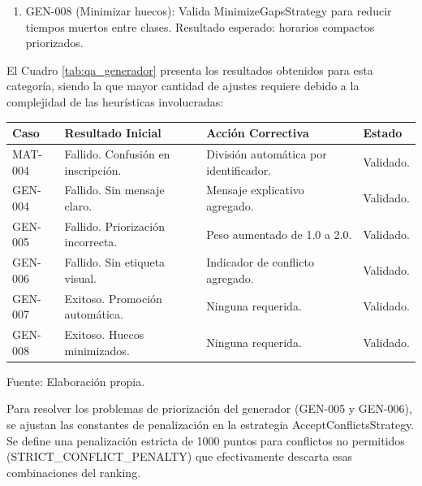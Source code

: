 \begin{enumerate}
\begin{enumerate}[label=\alph*)]
    \item GEN-008 (Minimizar huecos): Valida MinimizeGapsStrategy para reducir tiempos muertos entre clases. Resultado esperado: horarios compactos priorizados.
  \end{enumerate}
  
  El Cuadro \ref{tab:qa_generador} presenta los resultados obtenidos para esta categoría, siendo la que mayor cantidad de ajustes requiere debido a la complejidad de las heurísticas involucradas:
  
  \begin{center}
  \begin{minipage}{\linewidth}
  \centering
  \begin{tabularx}{\linewidth}{@{}>{\RaggedRight\arraybackslash}p{2.0cm}>{\RaggedRight\arraybackslash}X>{\RaggedRight\arraybackslash}X>{\RaggedRight\arraybackslash}p{1.8cm}@{}}
  \toprule
  Caso & Resultado Inicial & Acción Correctiva & Estado \\
  \midrule
  MAT-004 & Fallido. Confusión en inscripción. & División automática por identificador. & Validado. \\
  \addlinespace
  GEN-004 & Fallido. Sin mensaje claro. & Mensaje explicativo agregado. & Validado. \\
  \addlinespace
  GEN-005 & Fallido. Priorización incorrecta. & Peso aumentado de 1.0 a 2.0. & Validado. \\
  \addlinespace
  GEN-006 & Fallido. Sin etiqueta visual. & Indicador de conflicto agregado. & Validado. \\
  \addlinespace
  GEN-007 & Exitoso. Promoción automática. & Ninguna requerida. & Validado. \\
  \addlinespace
  GEN-008 & Exitoso. Huecos minimizados. & Ninguna requerida. & Validado. \\
  \bottomrule
  \end{tabularx}
  \label{tab:qa_generador}
  Fuente: Elaboración propia.
  \end{minipage}
  \end{center}
  
  Para resolver los problemas de priorización del generador (GEN-005 y GEN-006), se ajustan las constantes de penalización en la estrategia AcceptConflictsStrategy. Se define una penalización estricta de 1000 puntos para conflictos no permitidos (STRICT\_CONFLICT\_PENALTY) que efectivamente descarta esas combinaciones del ranking.
  

\end{enumerate}
